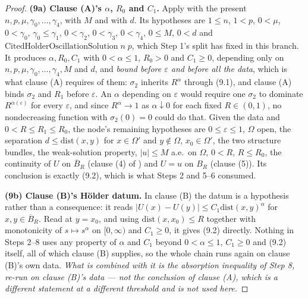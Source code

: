 \begin{proof}
\textbf{(9a) Clause \textup{(A)}'s $\alpha$, $R_0$ and $C_1$.}  Apply
 with the present
$n,p,\mu,\gamma_0,\dots,\gamma_4$, with $M$ and with $d$.  Its hypotheses are
$1\le n$, $1<p$, $0<\mu$, $0<\gamma_0$, $\gamma_0\le\gamma_1$, $0<\gamma_2$,
$0<\gamma_3$, $0<\gamma_4$, $0\le M$, $0<d$ and
$\mathrm{CitedHolderOscillationSolution}\;n\;p$, which Step 1's split has fixed
in this branch.  It produces $\alpha,R_0,C_1$ with $0<\alpha\le1$, $R_0>0$ and
$C_1\ge0$, depending only on $n,p,\mu,\gamma_0,\dots,\gamma_4,M$ and $d$, and
\emph{bound before $\varepsilon$ and before all the data}, which is what clause
(A) requires of them: $\sigma_2$ inherits $R^{\alpha}$ through (9.1), and clause
(A) binds $\sigma_2$ and $R_1$ before $\varepsilon$.  An $\alpha$ depending on
$\varepsilon$ would require one $\sigma_2$ to dominate $R^{\alpha(\varepsilon)}$
for every $\varepsilon$, and since $R^{\alpha}\to1$ as $\alpha\downarrow0$ for
each fixed $R\in(0,1)$, no nondecreasing function with $\sigma_2(0)=0$ could do
that.  Given the data and $0<R\le R_1\le R_0$, the node's remaining hypotheses
are $0\le\varepsilon\le1$, $\Omega$ open, the separation
$d\le\mathrm{dist}(x,y)$ for $x\in\Omega'$ and $y\notin\Omega$, $x_0\in\Omega'$,
the two structure bundles, the weak-solution property, $|u|\le M$ a.e.\ on
$\Omega$, $0<R$, $R\le R_0$, the continuity of $U$ on $\overline B_R$ (clause
(4) of ) and $U=u$ on $B_R$ (clause (5)).  Its
conclusion is exactly (9.2), which is what Steps 2 and 5--6 consumed.

\textbf{(9b) Clause \textup{(B)}'s H\"older datum.}  In clause (B) the datum is
a hypothesis rather than a consequence: it reads
$|U(x)-U(y)|\le C_1\mathrm{dist}(x,y)^{\alpha}$ for $x,y\in\overline B_R$.  Read
at $y=x_0$, and using $\mathrm{dist}(x,x_0)\le R$ together with monotonicity of
$s\mapsto s^{\alpha}$ on $[0,\infty)$ and $C_1\ge0$, it gives (9.2) directly.
Nothing in Steps 2--8 uses any property of $\alpha$ and $C_1$ beyond
$0<\alpha\le1$, $C_1\ge0$ and (9.2) itself, all of which clause (B) supplies, so
the whole chain runs again on clause (B)'s own data.  \emph{What is combined with
it is the absorption inequality of Step 8, re-run on clause \textup{(B)}'s data
--- not the conclusion of clause \textup{(A)}, which is a different statement at
a different threshold and is not used here.}


\end{proof}
